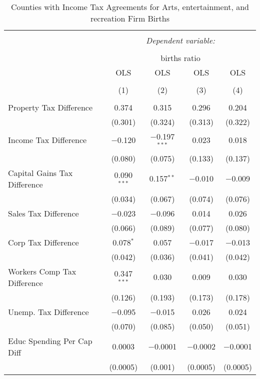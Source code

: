 
\begin{table}[!htbp] \centering 
  \caption{Counties with Income Tax Agreements for  Arts, entertainment, and recreation Firm Births} 
  \label{71rd} 
\begin{tabular}{@{\extracolsep{5pt}}lcccc} 
\\[-1.8ex]\hline 
\hline \\[-1.8ex] 
 & \multicolumn{4}{c}{\textit{Dependent variable:}} \\ 
\cline{2-5} 
\\[-1.8ex] & \multicolumn{4}{c}{births ratio} \\ 
 & OLS & OLS & OLS & OLS \\ 
\\[-1.8ex] & (1) & (2) & (3) & (4)\\ 
\hline \\[-1.8ex] 
 Property Tax Difference & 0.374 & 0.315 & 0.296 & 0.204 \\ 
  & (0.301) & (0.324) & (0.313) & (0.322) \\ 
  Income Tax Difference & $-$0.120 & $-$0.197$^{***}$ & 0.023 & 0.018 \\ 
  & (0.080) & (0.075) & (0.133) & (0.137) \\ 
  Capital Gains Tax Difference & 0.090$^{***}$ & 0.157$^{**}$ & $-$0.010 & $-$0.009 \\ 
  & (0.034) & (0.067) & (0.074) & (0.076) \\ 
  Sales Tax Difference & $-$0.023 & $-$0.096 & 0.014 & 0.026 \\ 
  & (0.066) & (0.089) & (0.077) & (0.080) \\ 
  Corp Tax Difference & 0.078$^{*}$ & 0.057 & $-$0.017 & $-$0.013 \\ 
  & (0.042) & (0.036) & (0.041) & (0.042) \\ 
  Workers Comp Tax Difference & 0.347$^{***}$ & 0.030 & 0.009 & 0.030 \\ 
  & (0.126) & (0.193) & (0.173) & (0.178) \\ 
  Unemp. Tax Difference & $-$0.095 & $-$0.015 & 0.026 & 0.024 \\ 
  & (0.070) & (0.085) & (0.050) & (0.051) \\ 
  Educ Spending Per Cap Diff & 0.0003 & $-$0.0001 & $-$0.0002 & $-$0.0001 \\ 
  & (0.0005) & (0.001) & (0.0005) & (0.0005) \\ 

\end{tabular}
\end{table}

